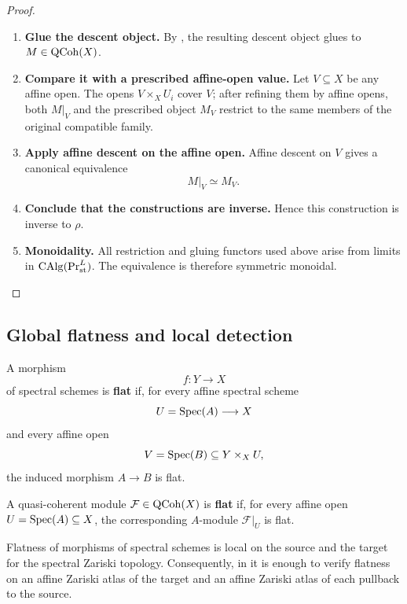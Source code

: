 \begin{proof}
\begin{enumerate}[label=\textup{(\arabic*)}]
    \item \textbf{Glue the descent object.}
    By , the resulting descent object glues to
    \(M\in\operatorname{QCoh}(X)\).

    \item \textbf{Compare it with a prescribed affine-open value.}
    Let \(V\subseteq X\) be any affine open. The opens
    \(V\times_XU_i\) cover \(V\); after refining them by affine opens, both
    \(M|_V\) and the prescribed object \(M_V\) restrict to the same members
    of the original compatible family.

    \item \textbf{Apply affine descent on the affine open.}
    Affine descent on \(V\) gives a
    canonical equivalence
    \[
        M|_V\simeq M_V.
    \]

    \item \textbf{Conclude that the constructions are inverse.}
    Hence this construction is inverse to \(\rho\).

    \item \textbf{Monoidality.}
    All restriction and gluing functors used above arise from limits in
    \(\operatorname{CAlg}(\operatorname{Pr}^L_{\mathrm{st}})\). The equivalence is therefore symmetric
    monoidal.
\end{enumerate}
\end{proof}

\subsection{Global flatness and local detection}

\begin{definition}
\label{def:flat-spectral-scheme-morphism}
A morphism
\[
    f
    \colon
    Y
    \longrightarrow
    X
\]
of spectral schemes is \textbf{flat} if, for every affine spectral scheme
\[
    U
    =
    \operatorname{Spec}(A)
    \longrightarrow
    X
\]
and every affine open
\[
    V
    =
    \operatorname{Spec}(B)
    \subseteq
    Y\times_XU,
\]
the induced morphism $A\to B$ is flat.

A quasi-coherent module $\mathcal F\in\operatorname{QCoh}(X)$ is \textbf{flat} if, for
every affine open $U=\operatorname{Spec}(A)\subseteq X$, the corresponding $A$-module
$\mathcal F|_U$ is flat.
\end{definition}

\begin{proposition}
\label{prop:global-flatness-zariski-local}
Flatness of morphisms of spectral schemes is local on the source and the
target for the spectral Zariski topology. Consequently, in
 it is enough to verify flatness on
an affine Zariski atlas of the target and an affine Zariski atlas of each
pullback to the source.
\end{proposition}

